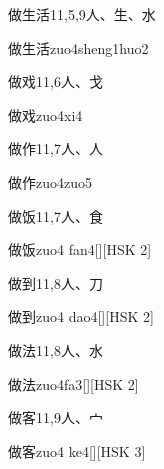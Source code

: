 \begin{entry}{做生活}{11,5,9}{⼈、⽣、⽔}
  \begin{phonetics}{做生活}{zuo4sheng1huo2}
  \end{phonetics}
\end{entry}

\begin{entry}{做戏}{11,6}{⼈、⼽}
  \begin{phonetics}{做戏}{zuo4xi4}
  \end{phonetics}
\end{entry}

\begin{entry}{做作}{11,7}{⼈、⼈}
  \begin{phonetics}{做作}{zuo4zuo5}
  \end{phonetics}
\end{entry}

\begin{entry}{做饭}{11,7}{⼈、⾷}
  \begin{phonetics}{做饭}{zuo4 fan4}[][HSK 2]
  \end{phonetics}
\end{entry}

\begin{entry}{做到}{11,8}{⼈、⼑}
  \begin{phonetics}{做到}{zuo4 dao4}[][HSK 2]
  \end{phonetics}
\end{entry}

\begin{entry}{做法}{11,8}{⼈、⽔}
  \begin{phonetics}{做法}{zuo4fa3}[][HSK 2]
  \end{phonetics}
\end{entry}

\begin{entry}{做客}{11,9}{⼈、⼧}
  \begin{phonetics}{做客}{zuo4 ke4}[][HSK 3]
  \end{phonetics}
\end{entry}


